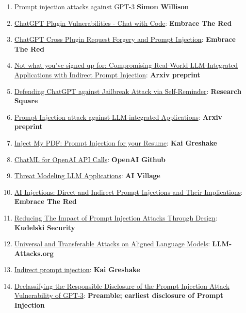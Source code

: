 \documentclass[
]{article}
\providecommand{\tightlist}{%
  \setlength{\itemsep}{0pt}\setlength{\parskip}{0pt}}
\begin{document}
\begin{enumerate}
\def\labelenumi{\arabic{enumi}.}
\tightlist
\item
  \href{https://simonwillison.net/2022/Sep/12/prompt-injection/}{Prompt
  injection attacks against GPT-3} \textbf{Simon Willison}
\item
  \href{https://embracethered.com/blog/posts/2023/chatgpt-plugin-vulns-chat-with-code/}{ChatGPT
  Plugin Vulnerabilities - Chat with Code}: \textbf{Embrace The Red}
\item
  \href{https://embracethered.com/blog/posts/2023/chatgpt-cross-plugin-request-forgery-and-prompt-injection./}{ChatGPT
  Cross Plugin Request Forgery and Prompt Injection}: \textbf{Embrace
  The Red}
\item
  \href{https://arxiv.org/pdf/2302.12173.pdf}{Not what you've signed up
  for: Compromising Real-World LLM-Integrated Applications with Indirect
  Prompt Injection}: \textbf{Arxiv preprint}
\item
  \href{https://www.researchsquare.com/article/rs-2873090/v1}{Defending
  ChatGPT against Jailbreak Attack via Self-Reminder}: \textbf{Research
  Square}
\item
  \href{https://arxiv.org/abs/2306.05499}{Prompt Injection attack
  against LLM-integrated Applications}: \textbf{Arxiv preprint}
\item
  \href{https://kai-greshake.de/posts/inject-my-pdf/}{Inject My PDF:
  Prompt Injection for your Resume}: \textbf{Kai Greshake}
\item
  \href{https://github.com/openai/openai-python/blob/main/chatml.md}{ChatML
  for OpenAI API Calls}: \textbf{OpenAI Github}
\item
  \href{http://aivillage.org/large\%20language\%20models/threat-modeling-llm/}{Threat
  Modeling LLM Applications}: \textbf{AI Village}
\item
  \href{https://embracethered.com/blog/posts/2023/ai-injections-direct-and-indirect-prompt-injection-basics/}{AI
  Injections: Direct and Indirect Prompt Injections and Their
  Implications}: \textbf{Embrace The Red}
\item
  \href{https://research.kudelskisecurity.com/2023/05/25/reducing-the-impact-of-prompt-injection-attacks-through-design/}{Reducing
  The Impact of Prompt Injection Attacks Through Design}:
  \textbf{Kudelski Security}
\item
  \href{https://llm-attacks.org/}{Universal and Transferable Attacks on
  Aligned Language Models}: \textbf{LLM-Attacks.org}
\item
  \href{https://kai-greshake.de/posts/llm-malware/}{Indirect prompt
  injection}: \textbf{Kai Greshake}
\item
  \href{https://www.preamble.com/prompt-injection-a-critical-vulnerability-in-the-gpt-3-transformer-and-how-we-can-begin-to-solve-it}{Declassifying
  the Responsible Disclosure of the Prompt Injection Attack
  Vulnerability of GPT-3}: \textbf{Preamble; earliest disclosure of
  Prompt Injection}
\end{enumerate}
\end{document}
